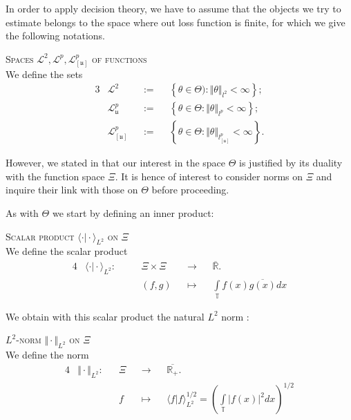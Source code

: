 \begin{Liste}[]
In order to apply decision theory, we have to assume that the objects we try to estimate belongs to the space where out loss function is finite, for which we give the following notations.
\begin{de}{\textsc{Spaces $\mathcal{L}^{2}, \mathcal{L}^{p}, \mathcal{L}_{[\mathfrak{u}]}^{p}$ of functions}\\}\label{DE_INTRO_FREQ_SPACELTHETA}
We define the sets
\begin{alignat*}{3}
&\mathcal{L}^{2} &&:=&& \left\{\theta \in \Theta) : \Vert \theta \Vert_{l^{2}} < \infty \right\};\\
&\mathcal{L}_{\mathfrak{u}}^{p} &&:=&& \left\{\theta \in \Theta : \Vert \theta \Vert_{l^{p}} < \infty \right\};\\
&\mathcal{L}_{[\mathfrak{u}]}^{p} &&:=&& \left\{\theta \in \Theta : \Vert \theta \Vert_{l_{[\mathfrak{u}]}^{p}} < \infty \right\}.
\end{alignat*}
\end{de}

\bigskip

However, we stated in  that our interest in the space $\Theta$ is justified by its duality with the function space $\Xi$.
It is hence of interest to consider norms on $\Xi$ and inquire their link with those on $\Theta$ before proceeding.

As with $\Theta$ we start by defining an inner product:

\begin{de}{\textsc{Scalar product $\langle \cdot \vert \cdot\rangle_{L^{2}}$ on $\Xi$}\\}\label{DE_INTRO_FREQ_SCALARXI}
We define the scalar product
\begin{alignat*}{4}
& \langle \cdot \vert \cdot \rangle_{L^{2}} : && \quad \Xi \times \Xi && \rightarrow && \overline{\mathds{R}}.\\
& && \quad (f, g) && \mapsto && \int\limits_{\mathds{T}} f(x) \overline{g(x)} dx
\end{alignat*}
\end{de}

We obtain with this scalar product the natural $L^{2}$ norm :
\begin{de}{\textsc{$L^{2}$-norm $\Vert \cdot \Vert_{L^{2}}$ on $\Xi$}\\}\label{DE_INTRO_FREQ_L2XI}
We define the norm
\begin{alignat*}{4}
& \Vert \cdot \Vert_{L^{2}} : && \Xi && \rightarrow && \overline{\mathds{R}_{+}}.\\
& && f && \mapsto && \langle f \vert f \rangle_{L^{2}}^{1/2} = \left(\int\limits_{\mathds{T}} \vert f(x)\vert^{2} dx\right)^{1/2}
\end{alignat*}
\end{de}


\end{Liste}

